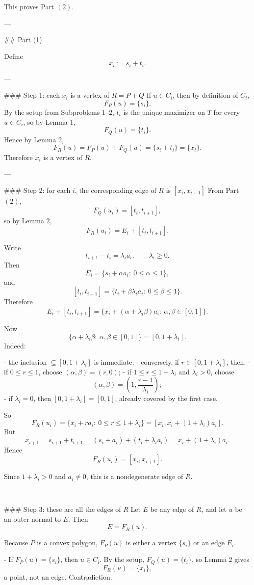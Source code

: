 This proves Part \((2)\).

---

## Part (1)

Define
\[
x_i:=s_i+t_i.
\]

---

### Step 1: each \(x_i\) is a vertex of \(R=P+Q\)
If \(u\in C_i\), then by definition of \(C_i\),
\[
F_P(u)=\{s_i\}.
\]
By the setup from Subproblems \(1\)–\(2\), \(t_i\) is the unique maximizer on \(T\) for every \(u\in C_i\), so by Lemma 1,
\[
F_Q(u)=\{t_i\}.
\]
Hence by Lemma 2,
\[
F_R(u)=F_P(u)+F_Q(u)=\{s_i+t_i\}=\{x_i\}.
\]
Therefore \(x_i\) is a vertex of \(R\).

---

### Step 2: for each \(i\), the corresponding edge of \(R\) is \([x_i,x_{i+1}]\)
From Part \((2)\),
\[
F_Q(u_i)=[t_i,t_{i+1}],
\]
so by Lemma 2,
\[
F_R(u_i)=E_i+[t_i,t_{i+1}].
\]

Write
\[
t_{i+1}-t_i=\lambda_i a_i,\qquad \lambda_i\ge 0.
\]
Then
\[
E_i=\{s_i+\alpha a_i:\ 0\le \alpha\le 1\},
\]
and
\[
[t_i,t_{i+1}]
=\{t_i+\beta\lambda_i a_i:\ 0\le \beta\le 1\}.
\]
Therefore
\[
E_i+[t_i,t_{i+1}]
=\{x_i+(\alpha+\lambda_i\beta)a_i:\ \alpha,\beta\in[0,1]\}.
\]

Now
\[
\{\alpha+\lambda_i\beta:\ \alpha,\beta\in[0,1]\}=[0,1+\lambda_i].
\]
Indeed:

- the inclusion \(\subseteq [0,1+\lambda_i]\) is immediate;
- conversely, if \(r\in[0,1+\lambda_i]\), then:
  - if \(0\le r\le 1\), choose \((\alpha,\beta)=(r,0)\);
  - if \(1\le r\le 1+\lambda_i\) and \(\lambda_i>0\), choose
    \[
    (\alpha,\beta)=\left(1,\frac{r-1}{\lambda_i}\right);
    \]
  - if \(\lambda_i=0\), then \([0,1+\lambda_i]=[0,1]\), already covered by the first case.

So
\[
F_R(u_i)=\{x_i+ra_i:\ 0\le r\le 1+\lambda_i\}
=[x_i,x_i+(1+\lambda_i)a_i].
\]
But
\[
x_{i+1}
=s_{i+1}+t_{i+1}
=(s_i+a_i)+(t_i+\lambda_i a_i)
=x_i+(1+\lambda_i)a_i.
\]
Hence
\[
F_R(u_i)=[x_i,x_{i+1}].
\]

Since \(1+\lambda_i>0\) and \(a_i\neq 0\), this is a nondegenerate edge of \(R\).

---

### Step 3: these are all the edges of \(R\)
Let \(E\) be any edge of \(R\), and let \(u\) be an outer normal to \(E\). Then
\[
E=F_R(u).
\]

Because \(P\) is a convex polygon, \(F_P(u)\) is either a vertex \(\{s_i\}\) or an edge \(E_i\).

- If \(F_P(u)=\{s_i\}\), then \(u\in C_i\). By the setup, \(F_Q(u)=\{t_i\}\), so Lemma 2 gives
  \[
  F_R(u)=\{x_i\},
  \]
  a point, not an edge. Contradiction.

